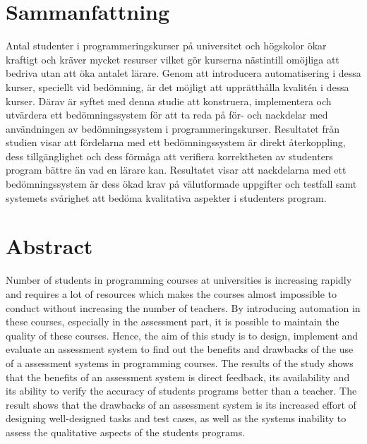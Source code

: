 \documentclass[a4paper,11pt]{article}
\begin{document}
{\newpage

\mbox{}

\newpage

\section*{Sammanfattning}

Antal studenter i programmeringskurser på universitet och högskolor ökar kraftigt och kräver mycket resurser vilket gör kurserna nästintill omöjliga att bedriva utan att öka antalet lärare. Genom att introducera automatisering i dessa kurser, speciellt vid bedömning, är det möjligt att upprätthålla kvalitén i dessa kurser. Därav är syftet med denna studie att konstruera, implementera och utvärdera ett bedömningssystem för att ta reda på för- och nackdelar med användningen av bedömningssystem i programmeringskurser. Resultatet från studien visar att fördelarna med ett bedömningssystem är direkt återkoppling, dess tillgänglighet och dess förmåga att verifiera korrektheten av studenters program bättre än vad en lärare kan. Resultatet visar att nackdelarna med ett bedömningssystem är dess ökad krav på välutformade uppgifter och testfall samt systemets svårighet att bedöma kvalitativa aspekter i studenters program.

\newpage

\mbox{}

\newpage

\section*{Abstract}

Number of students in programming courses at universities is increasing rapidly and requires a lot of resources which makes the courses almost impossible to conduct without increasing the number of teachers. By introducing automation in these courses, especially in the assessment part, it is possible to maintain the quality of these courses. Hence, the aim of this study is to design, implement and evaluate an assessment system to find out the benefits and drawbacks of the use of a assessment systems in programming courses. The results of the study shows that the benefits of an assessment system is direct feedback, its availability and its ability to verify the accuracy of students programs better than a teacher. The result shows that the drawbacks of an assessment system is its increased effort of designing well-designed tasks and test cases, as well as the systems inability to assess the qualitative aspects of the students programs.

}
\end{document}
